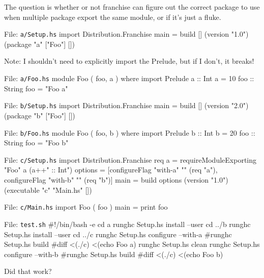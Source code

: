 \documentclass{article}
\newenvironment{file}[1]%
  {\endgraf\noindent File: \texttt{#1}%
   \endgraf\verbatim}%
  {\endverbatim}
\begin{document}
The question is whether or not franchise can figure out the
correct package to use when multiple package export the same
module, or if it's just a fluke.

\begin{file}{a/Setup.hs}
import Distribution.Franchise
main = build [] (version "1.0") (package "a" ["Foo"] [])
\end{file}

Note: I shouldn't need to explicitly import the Prelude, but if I don't,
it breaks!

\begin{file}{a/Foo.hs}
module Foo ( foo, a ) where
import Prelude
a :: Int
a = 10
foo :: String
foo = "Foo a"
\end{file}

\begin{file}{b/Setup.hs}
import Distribution.Franchise
main = build [] (version "2.0") (package "b" ["Foo"] [])
\end{file}

\begin{file}{b/Foo.hs}
module Foo ( foo, b ) where
import Prelude
b :: Int
b = 20
foo :: String
foo = "Foo b"
\end{file}

\begin{file}{c/Setup.hs}
import Distribution.Franchise
req a = requireModuleExporting "Foo" a (a++" :: Int")
options = [configureFlag "with-a" "" (req "a"),
           configureFlag "with-b" "" (req "b")]
main = build options (version "1.0") (executable "c" "Main.hs" [])
\end{file}

\begin{file}{c/Main.hs}
import Foo ( foo )
main = print foo
\end{file}

\begin{file}{test.sh}
#!/bin/bash -e
cd a
runghc Setup.hs install --user
cd ../b
runghc Setup.hs install --user
cd ../c
runghc Setup.hs configure --with-a
#runghc Setup.hs build
#diff <(./c) <(echo Foo a)
runghc Setup.hs clean
runghc Setup.hs configure --with-b
#runghc Setup.hs build
#diff <(./c) <(echo Foo b)
\end{file}

Did that work?
\end{document}
